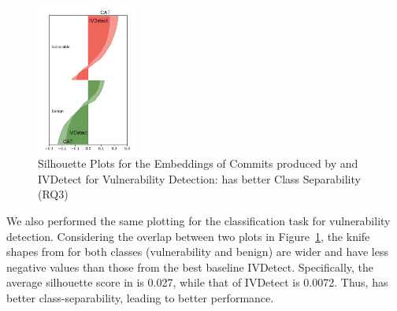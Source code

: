 \begin{figure}[t]
	\centering
	\includegraphics[width=1.3in]{graphs/plot-vd}
       \vspace{-6pt}
	\caption{Silhouette Plots for the Embeddings of Commits produced by {\tool} and IVDetect for Vulnerability Detection: {\tool} has better Class Separability (RQ3)}
	\label{fig:vd}
\end{figure}

We also performed the same plotting for the classification task for
vulnerability detection. Considering the overlap between two plots in
Figure~\ref{fig:vd}, the knife shapes from {\tool} for both classes
(vulnerability and benign) are wider and have less negative values
than those from the best baseline IVDetect. Specifically, the average
silhouette score in {\tool} is 0.027, while that of IVDetect is
0.0072. Thus, {\tool} has better class-separability, leading to better
performance.
